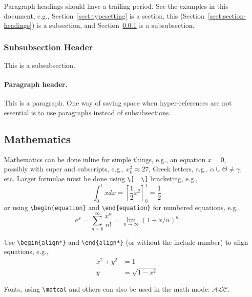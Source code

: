 \documentclass[]{easychair}
\begin{document}
Paragraph headings should have a trailing period.  See the examples in
this document, e.g., Section~\ref{sect:typesetting} is a section, this
(Section~\ref{sect:section-headings}) is a subsection, and
Section~\ref{sect:subsubsection-headings} is a subsubsection.

\subsubsection{Subsubsection Header}
\label{sect:subsubsection-headings}

This is a subsubsection. 

\paragraph{Paragraph header.}

This is a paragraph. 
One way of saving space when hyper-references are not essential is to 
use paragraphs instead of subsubsections.

\subsection{Mathematics}
\label{sect:mathematics}

Mathematics can be done inline for simple things, e.g., an equation
$x = 0$, possibly with super and subscripts, e.g., $x^2_k \approx 27$,
Greek letters, e.g., $\alpha \cup \Theta \ne \gamma$, etc.
Larger formulae must be done using {\tt \verb|\|[}~~{\tt \verb|\|]}
bracketing, e.g.,
\[
\int_{0}^{1} x dx = \left[ \frac{1}{2}x^2 \right]_{0}^{1} = \frac{1}{2}
\]
or using {\tt \verb|\|begin\{equation\}} and {\tt \verb|\|end\{equation\}} for
numbered equations, e.g.,
\begin{equation}
e^x = \sum_{n=0}^\infty \frac{x^n}{n!} = \lim_{n\rightarrow\infty} (1+x/n)^n
\end{equation}

Use {\tt \verb|\|begin\{align*\}} and {\tt \verb|\|end\{align*\}} (or without
the {\tt *} include number) to align equations, e.g.,
\begin{align*}
x^2 + y^2 &= 1 \\
y &= \sqrt{1 - x^2}
\end{align*}

Fonts, using \verb|\matcal| and others can also be used in the math mode: $\mathcal{ALC}$.
\end{document}
